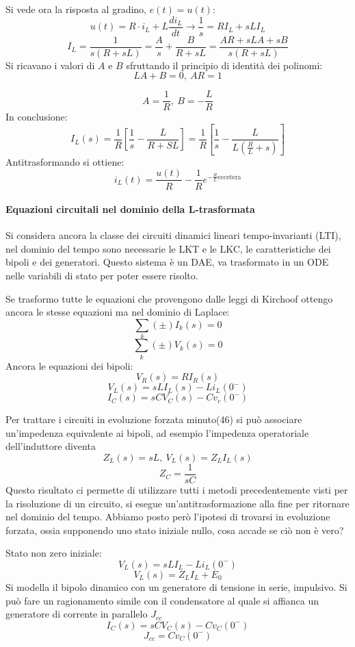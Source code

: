 Si vede ora la risposta al gradino, $e(t) = u(t)$:
$$
u(t) = R\cdot i_L+ L\frac{di_L}{dt} \rightarrow \frac{1}{s} = RI_L + sLI_L 
$$
$$
I_L = \frac{1}{s(R+sL)} = \frac{A}{s} + \frac{B}{R+sL} = \frac{AR+sLA+sB}{s(R+sL)}
$$
Si ricavano i valori di $A$ e $B$ sfruttando il principio di identità dei polinomi:
$$
LA+B = 0,\ AR = 1
$$

$$
A = \frac{1}{R},\ B = -\frac{L}{R}
$$
In conclusione:
$$
I_L(s) = \frac{1}{R}\left[\frac{1}{s}-\frac{L}{R+SL}\right] = \frac{1}{R}\left[\frac{1}{s}-
\frac{L}{L\left(\frac{R}{L}+s\right)}\right]
$$
Antitrasformando si ottiene:
$$
i_L(t) = \frac{u(t)}{R} - \frac{1}{R}e^{-\frac{R}{L} \text{eccetera}}
$$

\paragraph{Equazioni circuitali nel dominio della L-trasformata}
Si considera ancora la classe dei circuiti dinamici lineari tempo-invarianti (LTI),
nel dominio del tempo sono necessarie le LKT e le LKC, le caratteristiche dei bipoli e dei generatori.
Questo sistema è un DAE, va trasformato in un ODE nelle variabili di stato per poter essere risolto.

Se trasformo tutte le equazioni che provengono dalle leggi di Kirchoof ottengo ancora le stesse equazioni
ma nel dominio di Laplace:
$$
\sum_{k} (\pm)I_k(s) = 0
$$
$$
\sum_k (\pm)V_k(s) = 0
$$
Ancora le equazioni dei bipoli:
$$
V_R(s) = RI_R(s)
$$
$$
V_L(s) = sLI_L(s) - Li_L(0^-)
$$
$$
I_C(s) = sCV_C(s) - Cv_c(0^-)
$$

Per trattare i circuiti in evoluzione forzata minuto(46) si può associare un'impedenza equivalente
ai bipoli, ad esempio l'impedenza operatoriale dell'induttore diventa
$$
Z_L(s) = sL,\ V_L(s) = Z_LI_L(s)
$$
$$
Z_C = \frac{1}{sC}
$$
Questo risultato ci permette di utilizzare tutti i metodi precedentemente visti per la risoluzione
di un circuito, si esegue un'antitrasformazione alla fine per ritornare nel dominio del tempo.
Abbiamo posto però l'ipotesi di trovarsi in evoluzione forzata, ossia supponendo uno stato iniziale 
nullo, cosa accade se ciò non è vero?

Stato non zero iniziale:
$$
V_L(s) = sLI_L - L i_L(0^-)
$$
$$
V_L(s) = Z_LI_L+E_0
$$
Si modella il bipolo dinamico con un generatore di tensione in serie, impulsivo.
Si può fare un ragionamento simile con il condensatore al quale si affianca un generatore di corrente
in parallelo $J_{cc}$
$$
I_C(s) = sCV_C(s) - Cv_C(0^-)
$$
$$
J_{cc} = Cv_C(0^-)
$$

